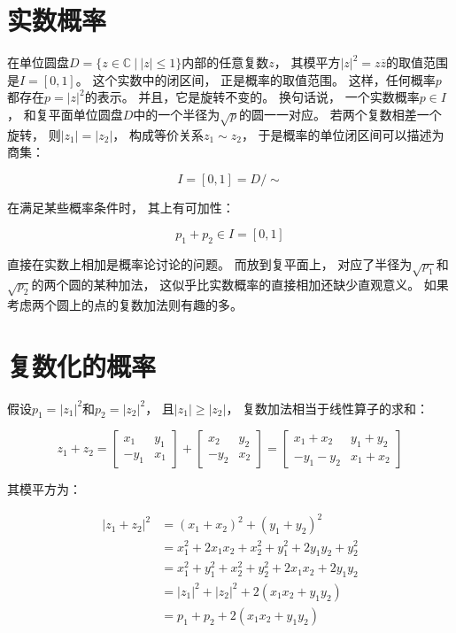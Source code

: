 \documentclass[10pt, openany]{book}
\begin{document}
\section{实数概率}

在单位圆盘$D = \{z \in \mathbb C \ | \ |z| \leq 1\}$内部的任意复数$z$，
其模平方$|z|^2 = z \overline z$的取值范围是$I = [0,1]$。
这个实数中的闭区间，
正是概率的取值范围。
这样，任何概率$p$都存在$p = |z|^2$的表示。
并且，它是旋转不变的。
换句话说，
一个实数概率$p\in I$，
和复平面单位圆盘$D$中的一个半径为$\sqrt{p}$的圆一一对应。
若两个复数相差一个旋转，
则$|z_1| = |z_2|$，
构成等价关系$z_1 \sim z_2$，
于是概率的单位闭区间可以描述为商集：

$$
I = [0,1] = D/\sim
$$

在满足某些概率条件时，
其上有可加性：

\begin{equation}
p_1 + p_2 \in I = [0,1]
\end{equation}
\label{eq:real-prob-sum}

直接在实数上相加是概率论讨论的问题。
而放到复平面上，
对应了半径为$\sqrt{p_1}$和$\sqrt{p_2}$的两个圆的某种加法，
这似乎比实数概率的直接相加还缺少直观意义。
如果考虑两个圆上的点的复数加法则有趣的多。

\section{复数化的概率}

假设$p_1 = |z_1|^2$和$p_2 = |z_2|^2$，
且$|z_1| \geq |z_2|$，
复数加法相当于线性算子的求和：

$$
z_1 + z_2
=\begin{bmatrix}x_1 & y_1 \\ -y_1 & x_1\end{bmatrix}
+ \begin{bmatrix}x_2 & y_2 \\ -y_2 & x_2\end{bmatrix}
= \begin{bmatrix}x_1 + x_2 & y_1 + y_2 \\ -y_1 - y_2 & x_1 + x_2 \end{bmatrix}
$$

其模平方为：

\begin{equation}
\begin{aligned}
|z_1 + z_2|^2
&= (x_1 + x_2)^2 + (y_1 + y_2)^2 \\
&= x_1^2 + 2x_1x_2 + x_2^2 + y_1^2 + 2y_1y_2 + y_2^2 \\
&= x_1^2 + y_1^2 + x_2^2 + y_2^2 + 2x_1x_2 + 2y_1y_2 \\
&= |z_1|^2 + |z_2|^2 + 2(x_1x_2 + y_1y_2) \\
&= p_1 + p_2 + 2(x_1x_2 + y_1y_2) \\
\end{aligned}
\end{equation}
\label{eq:complex-prob-sum}
\end{document}

